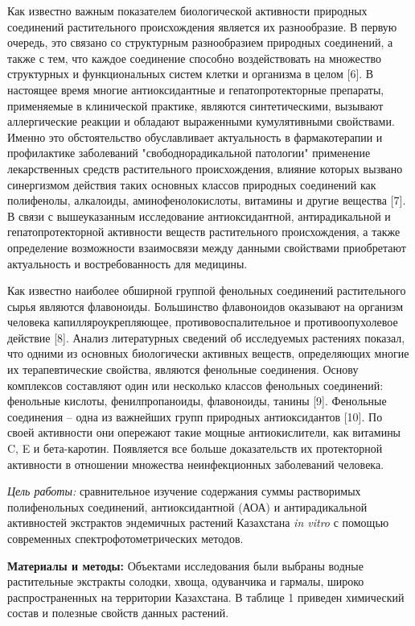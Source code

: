 Как известно важным показателем биологической активности природных
соединений растительного происхождения является их разнообразие. В
первую очередь, это связано со структурным разнообразием природных
соединений, а также с тем, что каждое соединение способно воздействовать
на множество структурных и функциональных систем клетки и организма в
целом {[}6{]}. В настоящее время многие антиоксидантные и
гепатопротекторные препараты, применяемые в клинической практике,
являются синтетическими, вызывают аллергические реакции и обладают
выраженными кумулятивными свойствами. Именно это обстоятельство
обуславливает актуальность в фармакотерапии и профилактике заболеваний
"свободнорадикальной патологии" применение лекарственных средств
растительного происхождения, влияние которых вызвано синергизмом
действия таких основных классов природных соединений как полифенолы,
алкалоиды, аминофенолокислоты, витамины и другие вещества {[}7{]}. В
связи с вышеуказанным исследование антиоксидантной, антирадикальной и
гепатопротекторной активности веществ растительного происхождения, а
также определение возможности взаимосвязи между данными свойствами
приобретают актуальность и востребованность для медицины.

Как известно наиболее обширной группой фенольных соединений
растительного сырья являются флавоноиды. Большинство флавоноидов
оказывают на организм человека капилляроукрепляющее,
противовоспалительное и противоопухолевое действие {[}8{]}. Анализ
литературных сведений об исследуемых растениях показал, что одними из
основных биологически активных веществ, определяющих многие их
терапевтические свойства, являются фенольные соединения. Основу
комплексов составляют один или несколько классов фенольных соединений:
фенольные кислоты, фенилпропаноиды, флавоноиды, танины {[}9{]}.
Фенольные соединения -- одна из важнейших групп природных антиоксидантов
{[}10{]}. По своей активности они опережают такие мощные антиокислители,
как витамины C, E и бета-каротин. Появляется все больше доказательств их
протекторной активности в отношении множества неинфекционных заболеваний
человека.

\emph{Цель работы:} сравнительное изучение содержания суммы растворимых
полифенольных соединений, антиоксидантной (АОА) и антирадикальной
активностей экстрактов эндемичных растений Казахстана \emph{in vitro} с
помощью современных спектрофотометрических методов.

{\bfseries Материалы и методы:} Объектами исследования были выбраны водные
растительные экстракты солодки, хвоща, одуванчика и гармалы, широко
распространенных на территории Казахстана. В таблице 1 приведен
химический состав и полезные свойств данных растений.

